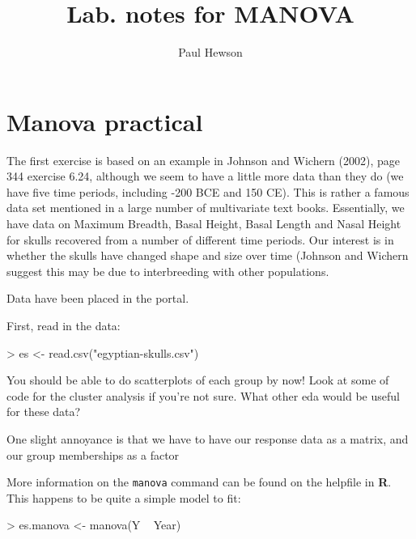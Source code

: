 \documentclass[11pt]{article}
\author{Paul Hewson}
\title{Lab. notes for MANOVA}
\begin{document}
\maketitle




\section{Manova practical}



The first exercise is based on an example in Johnson and Wichern (2002), page 344 exercise 6.24, although we seem to have a little more data than they do (we have five time periods, including -200 BCE and 150 CE).   This is rather a famous data set mentioned in a large number of multivariate text books.   Essentially, we have data on Maximum Breadth, Basal Height, Basal Length and Nasal Height for skulls recovered from a number of different time periods.   Our interest is in whether the skulls have changed shape and size over time (Johnson and Wichern suggest this may be due to interbreeding with other populations.

Data have been placed in the portal.

First, read in the data:

\begin{Schunk}
\begin{Sinput}
>  es <- read.csv("egyptian-skulls.csv")
\end{Sinput}
\end{Schunk}

You should be able to do scatterplots of each group by now!   Look at some of code for the cluster analysis if you're not sure.   What other eda would be useful for these data?

One slight annoyance is that we have to have our response data as a matrix, and our group memberships as a factor

\begin{Schunk}
\end{Schunk}

More information on the \texttt{manova} command can be found on the helpfile in \textbf{R}.   This happens to be quite a simple model to fit:


\begin{Schunk}
\begin{Sinput}
> es.manova <- manova(Y ~ Year)
\end{Sinput}
\end{Schunk}
\end{document}
